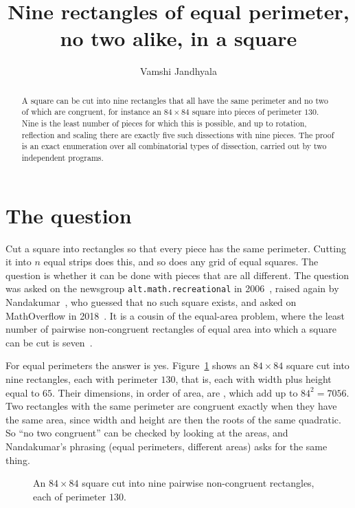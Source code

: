 \documentclass[11pt]{article}
\title{Nine rectangles of equal perimeter, no two alike, in a square}
\author{Vamshi Jandhyala}
\date{}
\begin{document}
\maketitle
\vspace{-2em}

\begin{abstract}
A square can be cut into nine rectangles that all have the same perimeter and no two of which are congruent, for instance an $84\times84$ square into pieces of perimeter $130$. Nine is the least number of pieces for which this is possible, and up to rotation, reflection and scaling there are exactly five such dissections with nine pieces. The proof is an exact enumeration over all combinatorial types of dissection, carried out by two independent programs.
\end{abstract}

\section{The question}

Cut a square into rectangles so that every piece has the same perimeter. Cutting it into $n$ equal strips does this, and so does any grid of equal squares. The question is whether it can be done with pieces that are all different. The question was asked on the newsgroup \texttt{alt.math.recreational} in 2006~\cite{vanvera}, raised again by Nandakumar~\cite[p.~5]{nandakumar}, who guessed that no such square exists, and asked on MathOverflow in 2018~\cite{mo}. It is a cousin of the equal-area problem, where the least number of pairwise non-congruent rectangles of equal area into which a square can be cut is seven~\cite{dalfo}.

For equal perimeters the answer is yes. Figure~\ref{fig:84} shows an $84\times 84$ square cut into nine rectangles, each with perimeter $130$, that is, each with width plus height equal to $65$. Their dimensions, in order of area, are
, which add up to $84^2=7056$. Two rectangles with the same perimeter are congruent exactly when they have the same area, since width and height are then the roots of the same quadratic. So ``no two congruent'' can be checked by looking at the areas, and Nandakumar's phrasing (equal perimeters, different areas) asks for the same thing.

\begin{figure}[ht]
\centering

\caption{An $84\times84$ square cut into nine pairwise non-congruent rectangles, each of perimeter $130$.}
\label{fig:84}
\end{figure}
\end{document}
